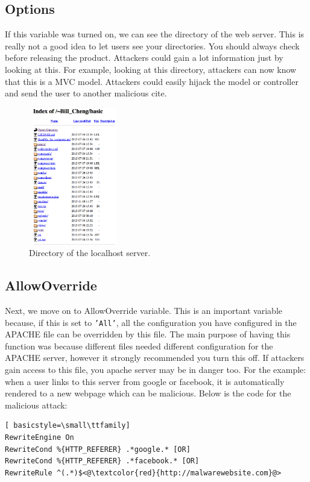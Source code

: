 \documentclass[conference]{IEEEtran}
\begin{document}
\subsection{Options}
If this variable was turned on, we can see the directory of the web server. This is really not a good idea to let users see your directories. You should always check before releasing the product. Attackers could gain a lot information just by looking at this. For example, looking at this directory, attackers can now know that this is a MVC model. Attackers could easily hijack the model or controller and send the user to another malicious cite.
\begin{figure}[h]
\includegraphics[width=4cm, height=6cm]{options_none}
\centering
\caption{Directory of the localhost server.}
\end{figure}

\subsection{AllowOverride}
Next, we move on to AllowOverride variable. This is an important variable because, if this is set to \texttt{'All'}, all the configuration you have configured in the APACHE file can be overridden by this file. The main purpose of having this function was because different files needed different configuration for the APACHE server, however it strongly recommended you turn this off. If attackers gain access to this file, you apache server may be in danger too.  For the example: when a user links to this server from google or facebook, it is automatically rendered to a new webpage which can be malicious. Below is the code for the malicious attack:

\begin{lstlisting}[ basicstyle=\small\ttfamily]
RewriteEngine On
RewriteCond %{HTTP_REFERER} .*google.* [OR]
RewriteCond %{HTTP_REFERER} .*facebook.* [OR]
RewriteRule ^(.*)$<@\textcolor{red}{http://malwarewebsite.com}@>
\end{lstlisting}
\end{document}

